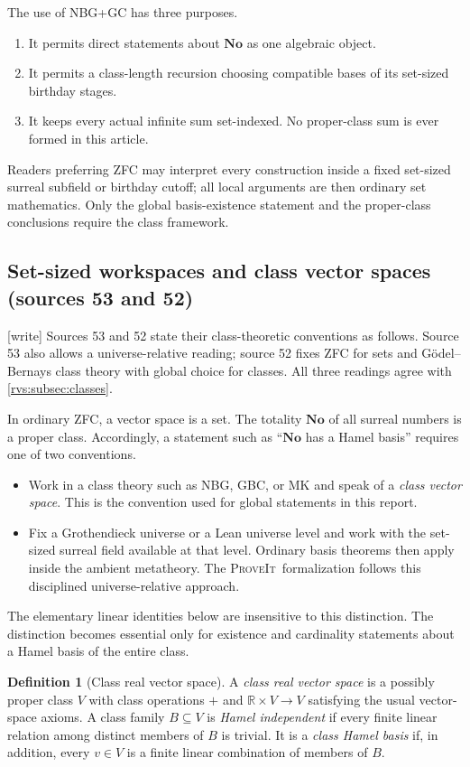 \documentclass[11pt,letterpaper]{article}
\numberwithin{equation}{section}
\theoremstyle{definition}
\newtheorem{definition}[theorem]{Definition}
\theoremstyle{remark}
\newcommand{\No}{\mathbf{No}}
\newcommand{\R}{\mathbb{R}}
\newcommand{\repo}{\textsc{ProveIt}}
\newcommand{\wtag}{\textup{[write]}}%
\begin{document}
The use of NBG+GC has three purposes.
\begin{enumerate}
\item It permits direct statements about \(\No\) as one algebraic object.
\item It permits a class-length recursion choosing compatible bases of its
set-sized birthday stages.
\item It keeps every actual infinite sum set-indexed.  No proper-class sum is
ever formed in this article.
\end{enumerate}
Readers preferring ZFC may interpret every construction inside a fixed
set-sized surreal subfield or birthday cutoff; all local arguments are then
ordinary set mathematics.  Only the global basis-existence statement and the
proper-class conclusions require the class framework.

\subsection{Set-sized workspaces and class vector spaces (sources 53 and 52)}\label{rvs:w:subsec:classes53}

\wtag{} Sources 53 and 52 state their class-theoretic conventions as
follows.  Source 53 also allows a universe-relative reading; source 52
fixes ZFC for sets and G\"odel--Bernays class theory with global choice for
classes.  All three readings agree with \cref{rvs:subsec:classes}.

In ordinary ZFC, a vector space is a set. The totality $\No$ of all surreal
numbers is a proper class. Accordingly, a statement such as ``$\No$ has a Hamel
basis'' requires one of two conventions.

\begin{itemize}
\item Work in a class theory such as NBG, GBC, or MK and speak of a
\emph{class vector space}. This is the convention used for global statements in
this report.
\item Fix a Grothendieck universe or a Lean universe level and work with the
set-sized surreal field available at that level. Ordinary basis theorems then apply
inside the ambient metatheory. The \repo\ formalization follows this disciplined
universe-relative approach.
\end{itemize}

The elementary linear identities below are insensitive to this distinction. The
distinction becomes essential only for existence and cardinality statements about
a Hamel basis of the entire class.
\begin{definition}[Class real vector space]
A \emph{class real vector space} is a possibly proper class $V$ with class
operations $+$ and $\R\times V\to V$ satisfying the usual vector-space axioms.
A class family $B\subseteq V$ is \emph{Hamel independent} if every finite linear
relation among distinct members of $B$ is trivial. It is a \emph{class Hamel
basis} if, in addition, every $v\in V$ is a finite linear combination of members
of $B$.
\end{definition}
\end{document}
